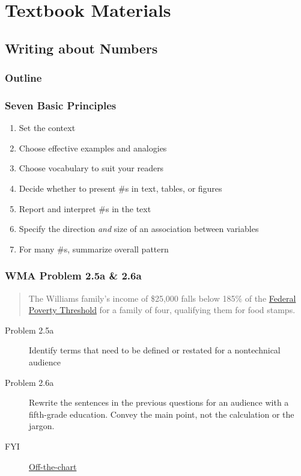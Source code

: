 \section{Textbook Materials}

\subsection{Writing about Numbers}

\begin{frame}
    \frametitle{Outline}
\end{frame}
\begin{frame}
    \frametitle{Seven Basic Principles}
     \begin{enumerate}
         \item Set the context 
         \item Choose effective examples and analogies
         \item Choose vocabulary to suit your readers
         \item Decide whether to present \#s in text, tables, or figures
         \item Report and interpret \#s in the text
         \item Specify the direction \emph{and} size of an association between variables
         \item For many \#s, summarize overall pattern 
     \end{enumerate}
\end{frame}

\begin{frame}
    \frametitle{WMA Problem 2.5a \& 2.6a}
        \begin{verse}
            The Williams family's income of \$25,000 falls below 185\% of the 
            \href{http://aspe.hhs.gov/poverty/12poverty.shtml}{Federal Poverty
            Threshold} for a family of four, qualifying them
            for food stamps. 
        \end{verse}
        \vskip0.3in
\begin{description}
    \item[Problem 2.5a] {Identify terms that need to be defined or restated
        for a nontechnical audience}
    \item[Problem 2.6a] Rewrite the sentences in the previous questions for an
        audience with a fifth-grade education.  Convey the main point,
        not the calculation or the jargon. 
    \item[FYI] \href{http://www.bloomberg.com/video/how-the-rich-get-richer-and-the-poor-poorer-kfuILNN9SoaQXLd5cVBwPQ.html}{Off-the-chart}
\end{description}
        
\end{frame}

